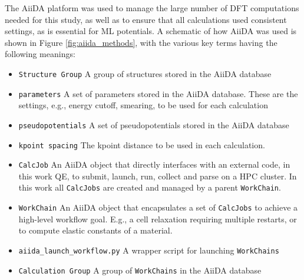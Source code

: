 \documentclass{article}
\begin{document}
The AiiDA\cite{Pizzi2016, Huber2020AiiDAProvenance} platform was used to manage the large number of DFT computations needed for this study, as well as to ensure that all calculations used consistent settings, as is essential for ML potentials\cite{Dragoni2018AchievingIron}.
A schematic of how AiiDA was used is shown in Figure \ref{fig:aiida_methods}, with the various key terms having the following meanings:
\begin{itemize}
    \item \texttt{Structure Group}  A group of structures stored in the AiiDA database
    \item \texttt{parameters}  A set of parameters stored in the AiiDA database. These are the settings, e.g., energy cutoff, smearing, to be used for each calculation
    \item \texttt{pseudopotentials}  A set of pseudopotentials stored in the AiiDA database 
    \item \texttt{kpoint spacing}  The kpoint distance to be used in each calculation. 
    \item \texttt{CalcJob}    An AiiDA object that directly interfaces with an external code, 
                                          in this work QE, to submit, launch, run, collect and parse on a HPC 
                                          cluster. In this work all \texttt{CalcJobs} are created and
                                          managed by a parent \texttt{WorkChain}.
    \item \texttt{WorkChain}  An AiiDA object that encapsulates a set of \texttt{CalcJobs} to 
                                          achieve a high-level workflow goal. E.g., a cell relaxation requiring 
                                          multiple restarts, or to compute elastic constants of a material. 
    \item \texttt{aiida_launch_workflow.py}  A wrapper script for launching \texttt{WorkChains} 
    \item \texttt{Calculation Group}  A group of \texttt{WorkChains} in the AiiDA database 
\end{itemize}
\end{document}
